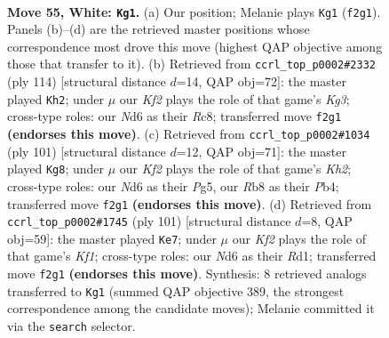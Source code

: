 \documentclass[11pt]{article}
\begin{document}
\clearpage

\begin{figure}[p]\centering
\begin{subfigure}{0.46\textwidth}\centering
\resizebox{\linewidth}{!}{%
\newchessgame
\chessboard[
  setfen={1R6/6p1/3N1pk1/7p/3P3P/6P1/r4K2/8 w - - 3 55},
  showmover=false,
  pgfstyle=straightmove, color=movearrow, markmove={f2-g1}
]}
\caption{}
\end{subfigure}\hfill
\begin{subfigure}{0.46\textwidth}\centering
\resizebox{\linewidth}{!}{%
\newchessgame
\chessboard[
  setfen={2R5/6pk/6p1/6Pp/7P/1r4K1/8/8 w - - 8 58},
  showmover=false,
  pgfstyle=straightmove, color=movearrow, markmove={g3-h2}
]}
\caption{}
\end{subfigure}
\\[4pt]
\begin{subfigure}{0.46\textwidth}\centering
\resizebox{\linewidth}{!}{%
\newchessgame
\chessboard[
  setfen={8/2R4k/1p5p/6p1/Pp4P1/6KP/6P1/1r6 b - - 1 51},
  showmover=false,
  pgfstyle=straightmove, color=movearrow, markmove={h7-g8}
]}
\caption{}
\end{subfigure}\hfill
\begin{subfigure}{0.46\textwidth}\centering
\resizebox{\linewidth}{!}{%
\newchessgame
\chessboard[
  setfen={1R3k2/6p1/5p2/p4P2/4KPP1/8/8/3r4 b - - 3 51},
  showmover=false,
  pgfstyle=straightmove, color=movearrow, markmove={f8-e7}
]}
\caption{}
\end{subfigure}
\caption{\textbf{Move 55, White: \texttt{Kg1}.} (a) Our position; Melanie plays \texttt{Kg1} (\texttt{f2g1}). Panels (b)--(d) are the retrieved master positions whose correspondence most drove this move (highest QAP objective among those that transfer to it). (b) Retrieved from \texttt{ccrl\_top\_p0002\#2332} (ply 114) [structural distance $d$=14, QAP obj=72]: the master played \texttt{Kh2}; under $\mu$ our \emph{Kf2} plays the role of that game's \emph{Kg3}; cross-type roles: our \emph{N}d6 as their \emph{R}c8; transferred move \texttt{f2g1} \textbf{(endorses this move)}. (c) Retrieved from \texttt{ccrl\_top\_p0002\#1034} (ply 101) [structural distance $d$=12, QAP obj=71]: the master played \texttt{Kg8}; under $\mu$ our \emph{Kf2} plays the role of that game's \emph{Kh2}; cross-type roles: our \emph{N}d6 as their \emph{P}g5, our \emph{R}b8 as their \emph{P}b4; transferred move \texttt{f2g1} \textbf{(endorses this move)}. (d) Retrieved from \texttt{ccrl\_top\_p0002\#1745} (ply 101) [structural distance $d$=8, QAP obj=59]: the master played \texttt{Ke7}; under $\mu$ our \emph{Kf2} plays the role of that game's \emph{Kf1}; cross-type roles: our \emph{N}d6 as their \emph{R}d1; transferred move \texttt{f2g1} \textbf{(endorses this move)}. Synthesis: 8 retrieved analogs transferred to \texttt{Kg1} (summed QAP objective 389, the strongest correspondence among the candidate moves); Melanie committed it via the \texttt{search} selector.}
\label{fig:thought-m108}
\end{figure}
\end{document}

